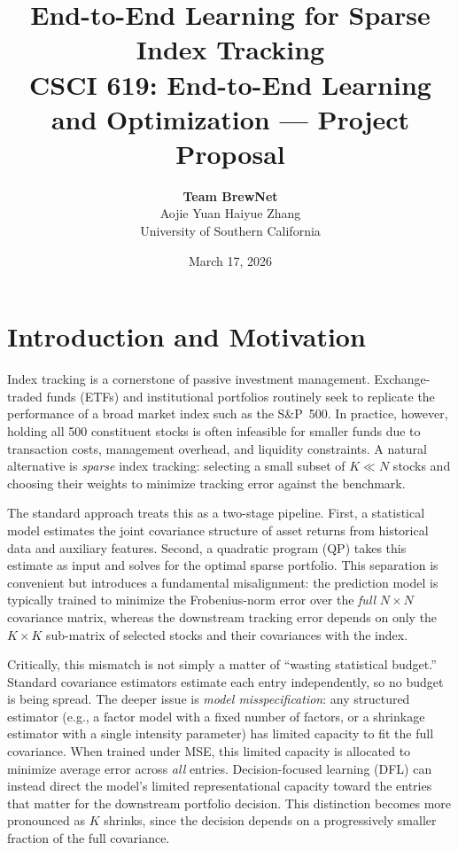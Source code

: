 \documentclass[11pt]{article}
\title{\textbf{End-to-End Learning for Sparse Index Tracking} \\[6pt]
\large CSCI 619: End-to-End Learning and Optimization --- Project Proposal}
\author{
  \textbf{Team BrewNet} \\[4pt]
  Aojie Yuan \quad Haiyue Zhang  \\[2pt]
  University of Southern California
}
\date{March 17, 2026}
\begin{document}
\maketitle

\section{Introduction and Motivation}

Index tracking is a cornerstone of passive investment management. Exchange-traded funds (ETFs) and institutional portfolios routinely seek to replicate the performance of a broad market index such as the S\&P~500. In practice, however, holding all 500 constituent stocks is often infeasible for smaller funds due to transaction costs, management overhead, and liquidity constraints. A natural alternative is \emph{sparse} index tracking: selecting a small subset of $K \ll N$ stocks and choosing their weights to minimize tracking error against the benchmark.

The standard approach treats this as a two-stage pipeline. First, a statistical model estimates the joint covariance structure of asset returns from historical data and auxiliary features. Second, a quadratic program (QP) takes this estimate as input and solves for the optimal sparse portfolio. This separation is convenient but introduces a fundamental misalignment: the prediction model is typically trained to minimize the Frobenius-norm error over the \emph{full} $N \times N$ covariance matrix, whereas the downstream tracking error depends on only the $K \times K$ sub-matrix of selected stocks and their covariances with the index.

Critically, this mismatch is not simply a matter of ``wasting statistical budget.'' Standard covariance estimators estimate each entry independently, so no budget is being spread. The deeper issue is \emph{model misspecification}: any structured estimator (e.g., a factor model with a fixed number of factors, or a shrinkage estimator with a single intensity parameter) has limited capacity to fit the full covariance. When trained under MSE, this limited capacity is allocated to minimize average error across \emph{all} entries. Decision-focused learning (DFL) can instead direct the model's limited representational capacity toward the entries that matter for the downstream portfolio decision. This distinction becomes more pronounced as $K$ shrinks, since the decision depends on a progressively smaller fraction of the full covariance.
\end{document}
